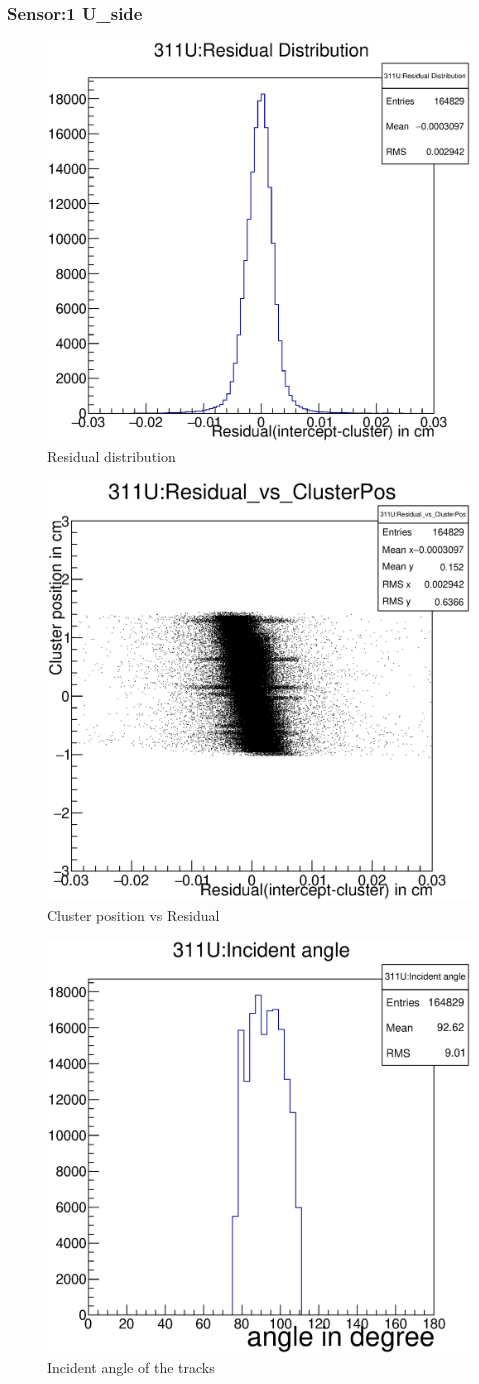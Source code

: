 \documentclass[12pt]{article}
\begin{document}
	\subsubsection{Sensor:1 U\_side}
	\begin{multicols}{3}
		
		\begin{figure}[H]
			\includegraphics[width=.3\textwidth]{311U:residualplot.eps}	
			\caption{Residual distribution}	
			\label{fig1}	
		\end{figure}
		\begin{figure}[H]
			\includegraphics[width=.3\textwidth]{311U:residual_vs_clusterpos.eps}	
			\caption{Cluster position vs Residual}	
			\label{fig2}	
		\end{figure}
		\begin{figure}[H]
			\includegraphics[width=.3\textwidth]{311U:incident_angle.eps}	
			\caption{Incident angle of the tracks}	
			\label{fig2}	
		\end{figure}
	\end{multicols}
	
\end{document}
